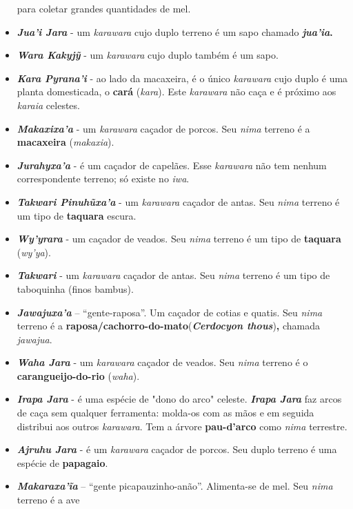 \begin{itemize}
  para coletar grandes quantidades de mel.
\item
  \emph{\textbf{Jua'i Jara}} - um \emph{karawara} cujo duplo terreno é
  um sapo chamado \textbf{\emph{jua'ia}.}
\item
  \emph{\textbf{Wara Kakyjỹ}} - um \emph{karawara} cujo duplo também é
  um sapo.
\item
  \emph{\textbf{Kara Pyrana'i}} - ao lado da macaxeira, é o único
  \emph{karawara} cujo duplo é uma planta domesticada, o \textbf{cará}
  (\emph{kara}). Este \emph{karawara} não caça e é próximo aos
  \emph{karaia} celestes.
\item
  \emph{\textbf{Makaxixa'a}} - um \emph{karawara} caçador de porcos. Seu
  \emph{nima} terreno é a \textbf{macaxeira} (\emph{makaxia}).
\item
  \emph{\textbf{Jurahyxa'a}} - é um caçador de capelães. Esse
  \emph{karawara} não tem nenhum correspondente terreno; só existe no
  \emph{iwa}.
\item
  \emph{\textbf{Takwari Pinuhũxa'a}} - um \emph{karawara} caçador de
  antas. Seu \emph{nima} terreno é um tipo de \textbf{taquara} escura.
\item
  \emph{\textbf{Wy'yrara}} - um caçador de veados. Seu \emph{nima}
  terreno é um tipo de \textbf{taquara} (\emph{wy'ya}).
\item
  \emph{\textbf{Takwari}} - um \emph{karawara} caçador de antas. Seu
  \emph{nima} terreno é um tipo de taboquinha (finos bambus).
\item
  \emph{\textbf{Jawajuxa'a}} -- ``gente-raposa''. Um caçador de cotias e
  quatis. Seu \emph{nima} terreno é a
  \textbf{raposa/cachorro-do-mato}(\emph{\textbf{Cerdocyon
  thous}})\textbf{,} chamada \emph{jawajua}.
\item
  \emph{\textbf{Waha Jara}} - um \emph{karawara} caçador de veados. Seu
  \emph{nima} terreno é o \textbf{carangueijo-do-rio} (\emph{waha}).
\item
  \emph{\textbf{Irapa Jara}} - é uma espécie de "dono do arco" celeste.
  \emph{\textbf{Irapa Jara}} faz arcos de caça sem qualquer ferramenta:
  molda-os com as mãos e em seguida distribui aos outros
  \emph{karawara}. Tem a árvore \textbf{pau-d'arco} como \emph{nima}
  terrestre.
\item
  \emph{\textbf{Ajruhu Jara}} - é um \emph{karawara} caçador de porcos.
  Seu duplo terreno é uma espécie de \textbf{papagaio}.
\item
  \emph{\textbf{Makaraxa'ĩa}} -- ``gente picapauzinho-anão''.
  Alimenta-se de mel. Seu \emph{nima} terreno é a ave

\end{itemize}

